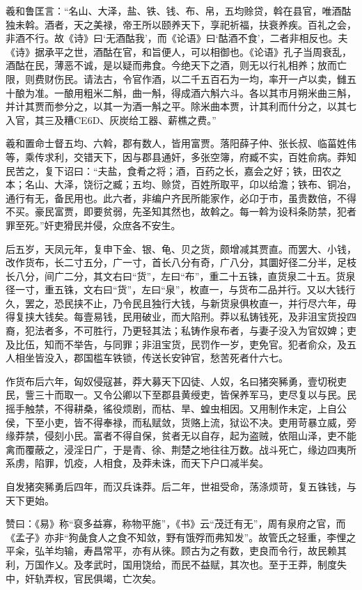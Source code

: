 \documentclass[]{article}
\begin{document}
羲和鲁匡言：``名山、大泽，盐、铁、钱、布、帛，五均赊贷，斡在县官，唯酒酤独未斡。酒者，天之美禄，帝王所以颐养天下，享祀祈福，扶衰养疾。百礼之会，非酒不行。故《诗》曰`无酒酤我'，而《论语》曰`酤酒不食'，二者非相反也。夫《诗》据承平之世，酒酤在官，和旨便人，可以相御也。《论语》孔子当周衰乱，酒酤在民，薄恶不诚，是以疑而弗食。今绝天下之酒，则无以行礼相养；放而亡限，则费财伤民。请法古，令官作酒，以二千五百石为一均，率开一卢以卖，雠五十酿为准。一酿用粗米二斛，曲一斛，得成酒六斛六斗。各以其市月朔米曲三斛，并计其贾而参分之，以其一为酒一斛之平。除米曲本贾，计其利而什分之，以其七入官，其三及糟CE6D、灰炭给工器、薪樵之费。''

羲和置命士督五均、六斡，郡有数人，皆用富贾。落阳薛子仲、张长叔、临菑姓伟等，乘传求利，交错天下，因与郡县通奸，多张空簿，府臧不实，百姓俞病。莽知民苦之，复下诏曰：``夫盐，食肴之将；酒，百药之长，嘉会之好；铁，田农之本；名山、大泽，饶衍之臧；五均、赊贷，百姓所取平，卬以给澹；铁布、铜冶，通行有无，备民用也。此六者，非编户齐民所能家作，必卬于市，虽贵数倍，不得不买。豪民富贾，即要贫弱，先圣知其然也，故斡之。每一斡为设科条防禁，犯者罪至死。''奸吏猾民并侵，众庶各不安生。

后五岁，天凤元年，复申下金、银、龟、贝之货，颇增减其贾直。而罢大、小钱，改作货布，长二寸五分，广一寸，首长八分有奇，广八分，其圜好径二分半，足枝长八分，间广二分，其文右曰``货''，左曰``布''，重二十五铢，直货泉二十五。货泉径一寸，重五铢，文右曰``货''，左曰``泉''，枚直一，与货布二品并行。又以大钱行久，罢之，恐民挟不止，乃令民且独行大钱，与新货泉俱枚直一，并行尽六年，毋得复挟大钱矣。每壹易钱，民用破业，而大陷刑。莽以私铸钱死，及非沮宝货投四裔，犯法者多，不可胜行，乃更轻其法；私铸作泉布者，与妻子没入为官奴婢；吏及比伍，知而不举告，与同罪；非沮宝货，民罚作一岁，吏免官。犯者俞众，及五人相坐皆没入，郡国槛车铁锁，传送长安钟官，愁苦死者什六七。

作货布后六年，匈奴侵寇甚，莽大募天下囚徒、人奴，名曰猪突豨勇，壹切税吏民，訾三十而取一。又令公卿以下至郡县黄绶吏，皆保养军马，吏尽复以与民。民摇手触禁，不得耕桑，徭役烦剧，而枯、旱、蝗虫相因。又用制作未定，上自公侯，下至小吏，皆不得奉禄，而私赋敛，货赂上流，狱讼不决。吏用苛暴立威，旁缘莽禁，侵刻小民。富者不得自保，贫者无以自存，起为盗贼，依阻山泽，吏不能禽而覆蔽之，浸淫日广，于是青、徐、荆楚之地往往万数。战斗死亡，缘边四夷所系虏，陷罪，饥疫，人相食，及莽未诛，而天下户口减半矣。

自发猪突豨勇后四年，而汉兵诛莽。后二年，世祖受命，荡涤烦苛，复五铢钱，与天下更始。

赞曰：《易》称``裒多益寡，称物平施''，《书》云``茂迁有无''，周有泉府之官，而《孟子》亦非``狗彘食人之食不知敛，野有饿殍而弗知发''。故管氏之轻重，李悝之平籴，弘羊均输，寿昌常平，亦有从徠。顾古为之有数，吏良而令行，故民赖其利，万国作乂。及孝武时，国用饶给，而民不益赋，其次也。至于王莽，制度失中，奸轨弄权，官民俱竭，亡次矣。
\end{document}
